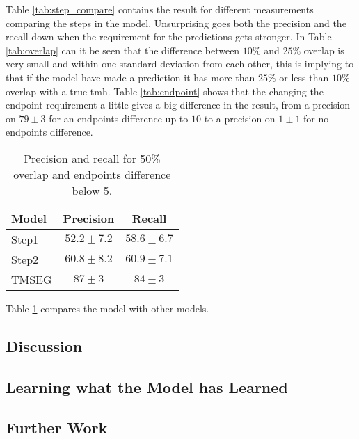 Table \ref{tab:step_compare} contains the result for different measurements 
comparing the steps in the model. Unsurprising goes both the precision and the 
recall down when the requirement for the predictions gets stronger. In 
Table \ref{tab:overlap} can it be seen that the difference between $10\%$ and $25\%$
overlap is very small and within one standard deviation from each other, 
this is implying to that if the model have made a prediction it has more than 
$25\%$ or less than $10\%$ overlap with a true \gls{tmh}.
Table \ref{tab:endpoint} shows that the changing the endpoint requirement a little 
gives a big difference in the result, from a precision on $79 \pm 3$ for an endpoints 
difference up to $10$ to a precision on $1 \pm 1$ for no endpoints difference.

\begin{table}
	\centering 
	\begin{tabular}{l|c|c} 
		Model & Precision & Recall \\ \hline 
		Step1 & $52.2 \pm 7.2$ & $58.6 \pm 6.7$ \\ 
		Step2 & $60.8 \pm 8.2$ & $60.9 \pm 7.1$ \\ 
		TMSEG\cite{tmseg} & $87 \pm 3$ & $84 \pm 3$
	\end{tabular}
    \caption{Precision and recall for 50\% overlap and endpoints difference below 5.}
	\label{tab:pr50}
\end{table}

Table \ref{tab:pr50} compares the model with other models.

\subsection{Discussion}

\subsection{Learning what the Model has Learned}

\subsection{Further Work}
